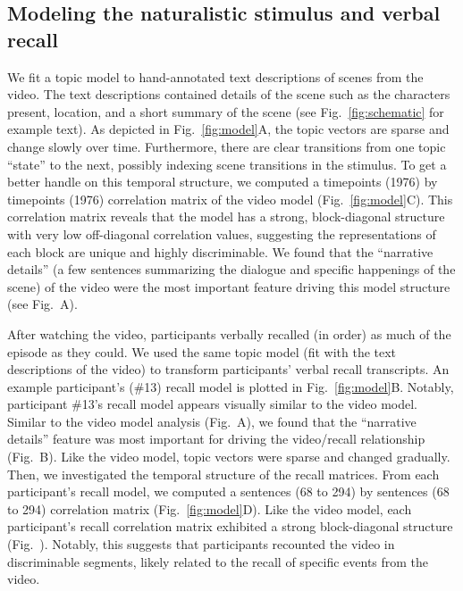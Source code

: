 
\subsection*{Modeling the naturalistic stimulus and verbal recall}
We fit a topic model \citep{BleiEtal03} to hand-annotated text descriptions of scenes from the video. The text descriptions contained details of the scene such as the characters present, location, and a short summary of the scene (see Fig.~\ref{fig:schematic} for example text). As depicted in Fig.~\ref{fig:model}A, the topic vectors are sparse and change slowly over time. Furthermore, there are clear transitions from one topic ``state'' to the next, possibly indexing scene transitions in the stimulus. To get a better handle on this temporal structure, we computed a timepoints (1976) by timepoints (1976) correlation matrix of the video model (Fig.~\ref{fig:model}C).  This correlation matrix reveals that the model has a strong, block-diagonal structure with very low off-diagonal correlation values, suggesting the representations of each block are unique and highly discriminable. We found that the ``narrative details'' (a few sentences summarizing the dialogue and specific happenings of the scene) of the video were the most important feature driving this model structure (see Fig.~\featureimportance A).

After watching the video, participants verbally recalled (in order) as much of the episode as they could.  We used the same topic model (fit with the text descriptions of the video) to transform participants' verbal recall transcripts. An example participant's (\#13) recall model is plotted in Fig.~\ref{fig:model}B. Notably, participant \#13's recall model appears visually similar to the video model. Similar to the video model analysis (Fig.~\featureimportance A), we found that the ``narrative details'' feature was most important for driving the video/recall relationship (Fig.~\featureimportance B).  Like the video model, topic vectors were sparse and changed gradually.  Then, we investigated the temporal structure of the recall matrices. From each participant's recall model, we computed a sentences (68 to 294) by sentences (68 to 294) correlation matrix (Fig.~\ref{fig:model}D). Like the video model, each participant's recall correlation matrix exhibited a strong block-diagonal structure (Fig.~\corrmats). Notably, this suggests that participants recounted the video in discriminable segments, likely related to the recall of specific events from the video.




